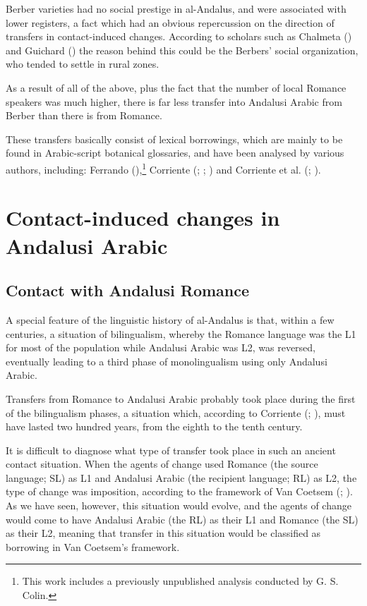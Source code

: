 \documentclass[output=paper,modfonts,nonflat]{langsci/langscibook}
\begin{document}
Berber varieties had no social prestige in al-Andalus, and were associated with lower registers, a fact which had an obvious repercussion on the direction of transfers in contact-induced changes. According to scholars such as Chalmeta (\citeyear[160]{Chalmeta2003}) and Guichard (\citeyear{Guichard1995}) the reason behind this could be the Berbers’ social organization, who tended to settle in rural zones. 

As a result of all of the above, plus the fact that the number of local Romance speakers was much higher, there is far less transfer into Andalusi Arabic from Berber than there is from Romance. 

These transfers basically consist of lexical borrowings, which are mainly to be found in Arabic-script botanical glossaries,  and have been analysed by various authors, including: Ferrando (\citeyear{Ferrando1997}),\footnote{This work includes a previously unpublished analysis conducted by G. S. Colin.} Corriente (\citeyear{Corriente1981}; \citeyear{Corriente1998Berber}; \citeyear{Corriente2002}) and Corriente et al. (\citeyear{CorrientePereiraVicente2017}; \citeyear{CorrientePereiraVicenteforthcoming}).


\section{Contact-induced changes in Andalusi Arabic} 

\subsection{Contact with Andalusi Romance}

A special feature of the linguistic history of al-Andalus is that, within a few centuries, a situation of bilingualism, whereby the Romance language was the L1 for most of the population while Andalusi Arabic was L2, was reversed, eventually leading to a third phase of monolingualism using only Andalusi Arabic. 

Transfers from Romance to Andalusi Arabic probably took place during the first of the bilingualism phases, a situation which, according to Corriente (\citeyear{Corriente2005};  \citeyear{Corriente2008}), must have lasted two hundred years, from the eighth to the tenth century. 

It is difficult to diagnose what type of transfer took place in such an ancient contact situation. When the agents of change used Romance (the source language; SL) as L1 and Andalusi Arabic (the recipient language; RL) as L2, the type of change was imposition, according to the framework of Van Coetsem (\citeyear{VanCoetsem1988}; \citeyear{VanCoetsem2000}). As we have seen, however, this situation would evolve, and the agents of change would come to have Andalusi Arabic (the RL) as their L1 and Romance (the SL) as their L2, meaning that transfer in this situation would be classified as borrowing in Van Coetsem’s framework. 
\end{document}
